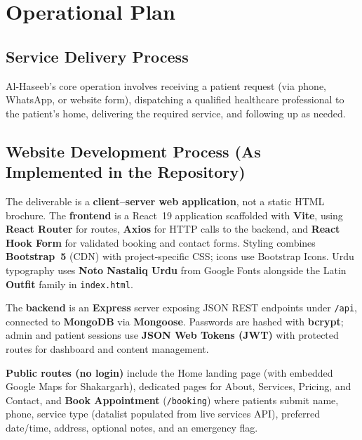 \documentclass[12pt, a4paper]{article}
\begin{document}
\newpage

\section{Operational Plan}

\subsection{Service Delivery Process}

Al-Haseeb's core operation involves receiving a patient request (via phone, WhatsApp, or website form), dispatching a qualified healthcare professional to the patient's home, delivering the required service, and following up as needed.

\subsection{Website Development Process (As Implemented in the Repository)}

The deliverable is a \textbf{client--server web application}, not a static HTML brochure. The \textbf{frontend} is a React~19 application scaffolded with \textbf{Vite}, using \textbf{React Router} for routes, \textbf{Axios} for HTTP calls to the backend, and \textbf{React Hook Form} for validated booking and contact forms. Styling combines \textbf{Bootstrap~5} (CDN) with project-specific CSS; icons use Bootstrap Icons. Urdu typography uses \textbf{Noto Nastaliq Urdu} from Google Fonts alongside the Latin \textbf{Outfit} family in \texttt{index.html}.

The \textbf{backend} is an \textbf{Express} server exposing JSON REST endpoints under \texttt{/api}, connected to \textbf{MongoDB} via \textbf{Mongoose}. Passwords are hashed with \textbf{bcrypt}; admin and patient sessions use \textbf{JSON Web Tokens (JWT)} with protected routes for dashboard and content management.

\textbf{Public routes (no login)} include the Home landing page (with embedded Google Maps for Shakargarh), dedicated pages for About, Services, Pricing, and Contact, and \textbf{Book Appointment} (\texttt{/booking}) where patients submit name, phone, service type (datalist populated from live services API), preferred date/time, address, optional notes, and an emergency flag.
\end{document}
